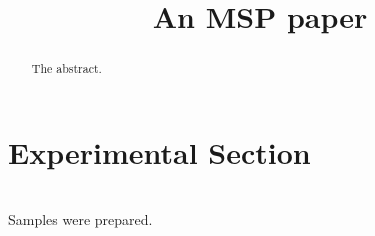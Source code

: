 \documentclass{WileyMSP-template}
\begin{document}
\title{An MSP paper}
\maketitle
\dedication{}
\dedication{To all of us.}
\begin{abstract}
The abstract.
\end{abstract}
\section{Experimental Section}
\\
Samples were prepared.
\end{document}
